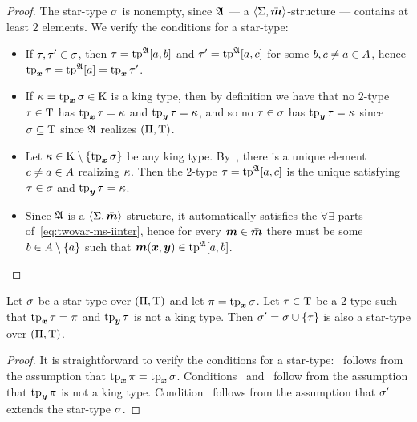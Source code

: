 \begin{proof}
The star-type $\sigma$ is nonempty, since $\mathfrak{A}$ --- a
$\left\langle \mathrm{\Sigma},\bar{\bm{m}} \right\rangle$-structure --- contains at least $2$ elements. We verify the
conditions for a star-type:
\begin{itemize}
  \item[\refstpcond1] If $\tau, {\tau'} \in \sigma$, then $\tau =
  \operatorname{tp}^{\mathfrak{A}}[a,b]$ and ${\tau'} = \operatorname{tp}^{\mathfrak{A}}[a,c]$ for some $b,c\neq a\in A$, hence
  $\operatorname{tp}_{\bm{x}}\tau = \operatorname{tp}^{\mathfrak{A}}[a] = \operatorname{tp}_{\bm{x}}{\tau'}$.
  \item[\refstpcond2] If $\kappa = \operatorname{tp}_{\bm{x}}\sigma\in\mathrm{K}$ is a king type, then by
  definition we have that no $2$-type $\tau\in\mathrm{T}$ has $\operatorname{tp}_{\bm{x}}\tau = \kappa$ and $\operatorname{tp}_{\bm{y}}\tau =
  \kappa$, and so no $\tau\in\sigma$ has $\operatorname{tp}_{\bm{y}}\tau = \kappa$ since
  $\sigma\subseteq\mathrm{T}$ since $\mathfrak{A}$ realizes $(\Pi,\mathrm{T})$.
  \item[\refstpcond3] Let $\kappa\in\mathrm{K}\setminus\left\{\operatorname{tp}_{\bm{x}}\sigma\right\}$ be any king type.
  By~, there is a unique element $c \neq a \in
  A$ realizing $\kappa$. Then the $2$-type $\tau = \operatorname{tp}^{\mathfrak{A}}[a,c]$ is the
  unique satisfying $\tau\in\sigma$ and $\operatorname{tp}_{\bm{y}}\tau = \kappa$.
  \item[\refstpcond4] Since $\mathfrak{A}$ is a $\left\langle \mathrm{\Sigma},\bar{\bm{m}} \right\rangle$-structure, it
  automatically satisfies the $\forall\exists$-parts of~\cref{eq:twovar-ms-iinter}, hence for 
  every $\bm{m} \in \bar{\bm{m}}$ there must be some $b \in A \setminus \left\{a\right\}$ such
  that $\bm{m}(\bm{x},\bm{y}) \in \operatorname{tp}^{\mathfrak{A}}[a,b]$.
\end{itemize}
\end{proof}

\begin{remark}\label{rem:star-type-ext}
Let $\sigma$ be a star-type over $(\Pi,\mathrm{T})$ and let $\pi = \operatorname{tp}_{\bm{x}}\sigma$.
Let $\tau \in \mathrm{T}$ be a $2$-type such that $\operatorname{tp}_{\bm{x}}\tau = \pi$ and
$\operatorname{tp}_{\bm{y}}\tau$ is not a king type.
Then ${\sigma'} = \sigma \cup \left\{\tau\right\}$ is also a star-type over
$(\Pi,\mathrm{T})$.
\end{remark}
\begin{proof}
It is straightforward to verify the conditions for a star-type:~
follows from the assumption that $\operatorname{tp}_{\bm{x}}\pi = \operatorname{tp}_{\bm{x}}\sigma$.
Conditions~ and~ follow from the assumption that
$\operatorname{tp}_{\bm{y}}\pi$ is not a king type.
Condition~ follows from the assumption that ${\sigma'}$ extends the
star-type $\sigma$.
\end{proof}

